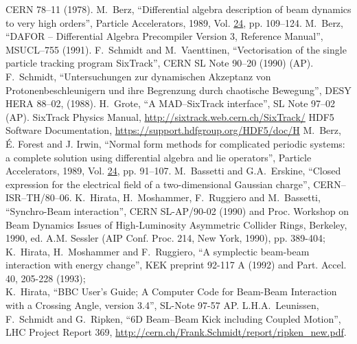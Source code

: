 \begin{thebibliography}{99}
        CERN 78--11 (1978).
        M.~Berz,
        ``Differential algebra description of beam dynamics to very high orders'',
        Particle Accelerators, 1989, Vol. \underline{24}, pp. 109--124.
        M.~Berz,
        ``DAFOR -- Differential Algebra Precompiler Version 3, Reference Manual'',
        MSUCL--755 (1991).
        F.~Schmidt and M.~Vaenttinen,
        ``Vectorisation of the single particle tracking program SixTrack'',
        CERN SL Note 90--20 (1990) (AP).
        F.~Schmidt,
        ``Untersuchungen zur dynamischen Akzeptanz von Protonenbeschleunigern und ihre Begrenzung durch chaotische Bewegung'',
        DESY HERA 88--02, (1988).
        H.~Grote,
        ``A MAD--SixTrack interface'',
        SL Note 97--02 (AP).
        SixTrack Physics Manual,
        \url{http://sixtrack.web.cern.ch/SixTrack/}
        HDF5 Software Documentation,
        \url{https://support.hdfgroup.org/HDF5/doc/H}
        M.~Berz, \'{E}. Forest and J. Irwin,
        ``Normal form methods for complicated periodic systems: a complete solution using differential algebra and lie operators'',
        Particle Accelerators, 1989, Vol. \underline{24}, pp. 91--107.
        M.~Bassetti and G.A.~Erskine,
        ``Closed expression for the electrical field of a two-dimensional Gaussian charge'',
        CERN--ISR--TH/80--06.
        K.~Hirata, H.~Moshammer, F.~Ruggiero and M.~Bassetti,
        ``Synchro-Beam interaction'',
        CERN SL-AP/90-02 (1990) and Proc. Workshop on Beam Dynamics Issues of High-Luminosity Asymmetric Collider Rings, Berkeley, 1990, ed. A.M. Sessler (AIP Conf. Proc. 214, New York, 1990), pp. 389-404;\\
        K.~Hirata, H.~Moshammer and F.~Ruggiero,
        ``A symplectic beam-beam interaction with energy change'',
        KEK preprint 92-117 A (1992) and Part. Accel. 40, 205-228 (1993);\\
        K.~Hirata,
        ``BBC User's Guide; A Computer Code for Beam-Beam Interaction with a Crossing Angle, version 3.4'',
        SL-Note 97-57 AP.
        L.H.A.~Leunissen, F.~Schmidt and G.~Ripken,
        ``6D Beam--Beam Kick including Coupled Motion'',
        LHC Project Report 369, \url{http://cern.ch/Frank.Schmidt/report/ripken\_new.pdf}.

\end{thebibliography}
